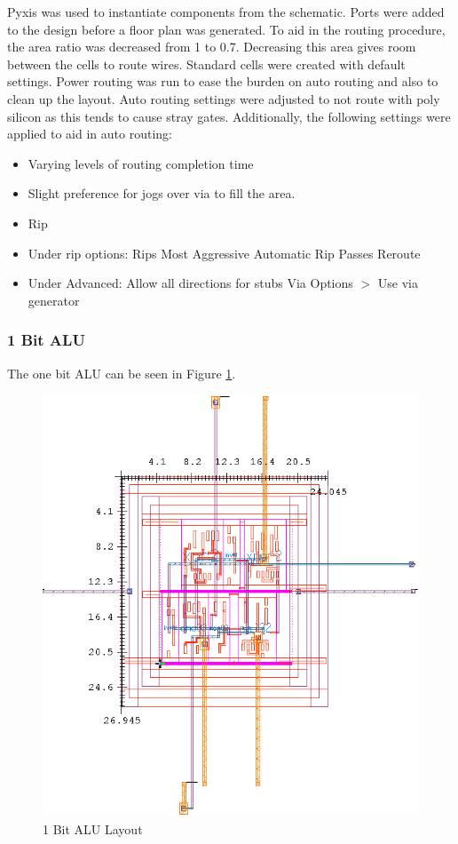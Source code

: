 \documentclass[11pt]{article}
\begin{document}
		Pyxis was used to instantiate components from the schematic. Ports were added to the design before a floor plan was generated. To aid in the routing procedure, the area ratio was decreased from 1 to 0.7. Decreasing this area gives room between the cells to route wires. Standard cells were created with default settings. Power routing was run to ease the burden on auto routing and also to clean up the layout. Auto routing settings were adjusted to not route with poly silicon as this tends to cause stray gates. Additionally, the following settings were applied to aid in auto routing:
		\begin{itemize}
			\item Varying levels of routing completion time
			\item Slight preference for jogs over via to fill the area.
			\item Rip
			\item Under rip options: 
			\subitem Rips Most Aggressive
			\subitem Automatic Rip Passes
			\subitem Reroute
			\item Under Advanced:
			\subitem Allow all directions for stubs
			\subitem Via Options $>$ Use via generator
		\end{itemize}
	
		\subsubsection{1 Bit ALU}
		
			The one bit ALU can be seen in Figure \ref{fig:alu-1bit-layout}.
		
			\begin{figure}[H]
				\centering
				\includegraphics[width=0.7\linewidth]{"Pictures/ALU 1-Bit Layout"}
				\caption{1 Bit ALU Layout}
				\label{fig:alu-1bit-layout}
			\end{figure}
			
\end{document}
